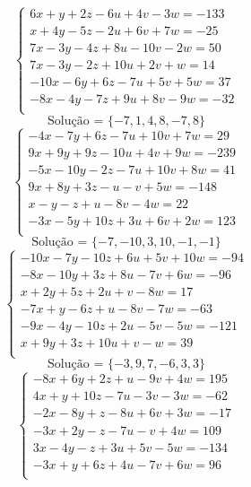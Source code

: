 \documentclass[12pt,oneside,a4paper]{article}
\begin{document}
\vspace{\baselineskip}
\begin{equation*}
\begin{cases}
6x+y+2z-6u+4v-3w=-133 \\
x+4y-5z-2u+6v+7w=-25 \\
7x-3y-4z+8u-10v-2w=50 \\
7x-3y-2z+10u+2v+w=14 \\
-10x-6y+6z-7u+5v+5w=37 \\
-8x-4y-7z+9u+8v-9w=-32 \\
\end{cases}
\end{equation*}
\begin{equation*}
\text{Solução = }\{-7,1,4,8,-7,8\}
\end{equation*}
\vspace{\baselineskip}
\begin{equation*}
\begin{cases}
-4x-7y+6z-7u+10v+7w=29 \\
9x+9y+9z-10u+4v+9w=-239 \\
-5x-10y-2z-7u+10v+8w=41 \\
9x+8y+3z-u-v+5w=-148 \\
x-y-z+u-8v-4w=22 \\
-3x-5y+10z+3u+6v+2w=123 \\
\end{cases}
\end{equation*}
\begin{equation*}
\text{Solução = }\{-7,-10,3,10,-1,-1\}
\end{equation*}
\vspace{\baselineskip}
\begin{equation*}
\begin{cases}
-10x-7y-10z+6u+5v+10w=-94 \\
-8x-10y+3z+8u-7v+6w=-96 \\
x+2y+5z+2u+v-8w=17 \\
-7x+y-6z+u-8v-7w=-63 \\
-9x-4y-10z+2u-5v-5w=-121 \\
x+9y+3z+10u+v-w=39 \\
\end{cases}
\end{equation*}
\begin{equation*}
\text{Solução = }\{-3,9,7,-6,3,3\}
\end{equation*}
\vspace{\baselineskip}
\begin{equation*}
\begin{cases}
-8x+6y+2z+u-9v+4w=195 \\
4x+y+10z-7u-3v-3w=-62 \\
-2x-8y+z-8u+6v+3w=-17 \\
-3x+2y-z-7u-v+4w=109 \\
3x-4y-z+3u+5v-5w=-134 \\
-3x+y+6z+4u-7v+6w=96 \\
\end{cases}
\end{equation*}
\end{document}
